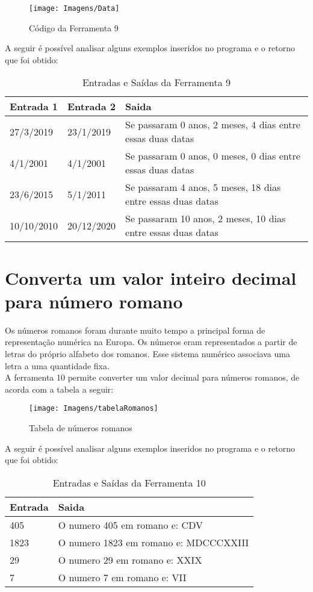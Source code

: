 \documentclass[12pt]{article}
\begin{document}
\begin{figure}[!htb]
     \centering
     \texttt{[image: Imagens/Data]}
     \caption{Código da Ferramenta 9}
     \label{Label de referência para a imagem}
\end{figure}

A seguir é possível analisar alguns exemplos inseridos no programa e o retorno que foi obtido:

\FloatBarrier
\begin{table}[ht]
\centering
\begin{tabular}{|l|l|l|}
\hline
\textbf{Entrada 1} & \textbf{Entrada 2} & \textbf{Saida}\\
\hline
27/3/2019 & 23/1/2019 & Se passaram 0 anos, 2 meses, 4 dias entre essas duas datas\\
4/1/2001 & 4/1/2001 & Se passaram 0 anos, 0 meses, 0 dias entre essas duas datas\\
23/6/2015 & 5/1/2011 & Se passaram 4 anos, 5 meses, 18 dias entre essas duas datas\\
10/10/2010 & 20/12/2020 & Se passaram 10 anos, 2 meses, 10 dias entre essas duas datas\\

\hline
\end{tabular}
\caption{Entradas e Saídas da Ferramenta 9}
\end{table} 

\newpage

\section{Converta um valor inteiro decimal para número romano}
Os números romanos foram durante muito tempo a principal forma de representação numérica na Europa. Os números eram representados a partir de letras do próprio alfabeto dos romanos. Esse sistema numérico associava uma letra a uma quantidade fixa.\\
A ferramenta 10 permite converter um valor decimal para números romanos, de acorda com a tabela a seguir:

\begin{figure}[!htb]
     \centering
     \texttt{[image: Imagens/tabelaRomanos]}
     \caption{Tabela de números romanos}
     \label{Label de referência para a imagem}
\end{figure}

A seguir é possível analisar alguns exemplos inseridos no programa e o retorno que foi obtido:

\FloatBarrier
\begin{table}[ht]
\centering
\begin{tabular}{|l|l|}
\hline
\textbf{Entrada} & \textbf{Saida}\\
\hline
405 &  O numero 405 em romano e: CDV\\
1823 &  O numero 1823 em romano e: MDCCCXXIII\\
29 &  O numero 29 em romano e: XXIX\\
7 &  O numero 7 em romano e: VII\\

\hline
\end{tabular}
\caption{Entradas e Saídas da Ferramenta 10}
\end{table} 
\end{document}
